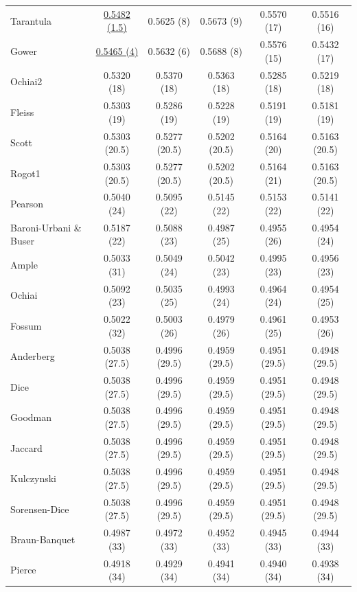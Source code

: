 \begin{table}[t]
{\begin{tabular}{lccccc}
Tarantula & \underline{0.5482 (1.5)} & 0.5625 (8) & 0.5673 (9) & 0.5570 (17) & 0.5516 (16) \\
Gower & \underline{0.5465 (4)} & 0.5632 (6) & 0.5688 (8) & 0.5576 (15) & 0.5432 (17) \\
Ochiai2 & 0.5320 (18) & 0.5370 (18) & 0.5363 (18) & 0.5285 (18) & 0.5219 (18) \\
Fleiss & 0.5303 (19) & 0.5286 (19) & 0.5228 (19) & 0.5191 (19) & 0.5181 (19) \\
Scott & 0.5303 (20.5) & 0.5277 (20.5) & 0.5202 (20.5) & 0.5164 (20) & 0.5163 (20.5) \\
Rogot1 & 0.5303 (20.5) & 0.5277 (20.5) & 0.5202 (20.5) & 0.5164 (21) & 0.5163 (20.5) \\
Pearson & 0.5040 (24) & 0.5095 (22) & 0.5145 (22) & 0.5153 (22) & 0.5141 (22) \\
Baroni-Urbani \& Buser & 0.5187 (22) & 0.5088 (23) & 0.4987 (25) & 0.4955 (26) & 0.4954 (24) \\
Ample & 0.5033 (31) & 0.5049 (24) & 0.5042 (23) & 0.4995 (23) & 0.4956 (23) \\
Ochiai & 0.5092 (23) & 0.5035 (25) & 0.4993 (24) & 0.4964 (24) & 0.4954 (25) \\
Fossum & 0.5022 (32) & 0.5003 (26) & 0.4979 (26) & 0.4961 (25) & 0.4953 (26) \\
Anderberg & 0.5038 (27.5) & 0.4996 (29.5) & 0.4959 (29.5) & 0.4951 (29.5) & 0.4948 (29.5) \\
Dice & 0.5038 (27.5) & 0.4996 (29.5) & 0.4959 (29.5) & 0.4951 (29.5) & 0.4948 (29.5) \\
Goodman & 0.5038 (27.5) & 0.4996 (29.5) & 0.4959 (29.5) & 0.4951 (29.5) & 0.4948 (29.5) \\
Jaccard & 0.5038 (27.5) & 0.4996 (29.5) & 0.4959 (29.5) & 0.4951 (29.5) & 0.4948 (29.5) \\
Kulczynski & 0.5038 (27.5) & 0.4996 (29.5) & 0.4959 (29.5) & 0.4951 (29.5) & 0.4948 (29.5) \\
Sorensen-Dice & 0.5038 (27.5) & 0.4996 (29.5) & 0.4959 (29.5) & 0.4951 (29.5) & 0.4948 (29.5) \\
Braun-Banquet & 0.4987 (33) & 0.4972 (33) & 0.4952 (33) & 0.4945 (33) & 0.4944 (33) \\
Pierce & 0.4918 (34) & 0.4929 (34) & 0.4941 (34) & 0.4940 (34) & 0.4938 (34) \\
\bottomrule
\end{tabular}
}
\end{table}
